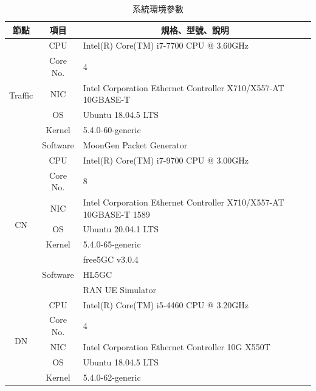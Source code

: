 \begin{table}[htbp]
    \centering
    \begin{tabular}{|c|c|l|}
        \hline
        \textbf{節點} & \textbf{項目} & \multicolumn{1}{c|}{\textbf{規格、型號、說明}} \\
        \hline
        \multirow{6}{*}{Traffic} & CPU & Intel(R) Core(TM) i7-7700 CPU @ 3.60GHz \\
        \cline{2-3}
        & Core No. & 4 \\
        \cline{2-3}
        & NIC & Intel Corporation Ethernet Controller X710/X557-AT 10GBASE-T \\
        \cline{2-3}
        & OS & Ubuntu 18.04.5 LTS \\
        \cline{2-3}
        & Kernel & 5.4.0-60-generic \\
        \cline{2-3}
        & Software & MoonGen Packet Generator~\cite{github.MoonGen} \\
        \hline
        \multirow{8}{*}{CN} & CPU & Intel(R) Core(TM) i7-9700 CPU @ 3.00GHz \\
        \cline{2-3}
        & Core No. & 8 \\
        \cline{2-3}
        & NIC & Intel Corporation Ethernet Controller X710/X557-AT 10GBASE-T 1589 \\
        \cline{2-3}
        & OS & Ubuntu 20.04.1 LTS \\
        \cline{2-3}
        & Kernel & 5.4.0-65-generic \\
        \cline{2-3}
        & \multirow{3}{*}{Software} & free5GC v3.0.4 \\
        & & HL5GC \\
        & & RAN UE Simulator \\
        \hline
        \multirow{5}{*}{DN} & CPU & Intel(R) Core(TM) i5-4460  CPU @ 3.20GHz \\
        \cline{2-3}
        & Core No. & 4 \\
        \cline{2-3}
        & NIC & Intel Corporation Ethernet Controller 10G X550T \\
        \cline{2-3}
        & OS & Ubuntu 18.04.5 LTS \\
        \cline{2-3}
        & Kernel & 5.4.0-62-generic \\
        \hline
    \end{tabular}
    \caption[系統環境參數]{{\footnotesize 系統環境參數}}
    \label{tab:sys_env}
\end{table}

